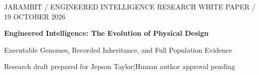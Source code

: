\documentclass[10pt,journal,letterpaper]{IEEEtran}
\begin{document}
\onecolumn
\thispagestyle{empty}
\begin{center}
{\sffamily\color{teal}\small JARAMBIT / ENGINEERED INTELLIGENCE RESEARCH WHITE PAPER / 19 OCTOBER 2026}\par\vspace{4mm}
{\sffamily\bfseries\color{ink}\fontsize{25}{28}\selectfont Engineered Intelligence: The Evolution of Physical Design}\par\vspace{3mm}
{\sffamily\color{ink}\fontsize{14}{18}\selectfont Executable Genomes, Recorded Inheritance, and Full Population Evidence}\par\vspace{3mm}
{\small Research draft prepared for Jepson Taylor\quad|\quad Human author approval pending}\par
\end{center}
\vspace{2mm}
\end{document}
